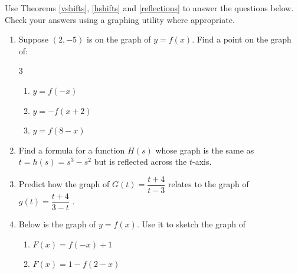 \documentclass{ximera}
\begin{document}
\begin{example}  \label{reflectionsex}  

Use Theorems  \ref{vshifts},  \ref{hshifts} and \ref{reflections}  to answer the questions below.  Check your answers using a graphing utility where appropriate.
 
 \begin{enumerate}
 
 \item   Suppose $(2,-5)$ is on the graph of $y = f(x)$.  Find a point on the graph of:
 
 \begin{multicols}{3}
 
 \begin{enumerate}
 
 \item $y = f(-x)$
 
 \item $y = -f(x+2)$
 
 \item  \label{twotransxrefex} $y = f(8-x)$
 
 \end{enumerate}
 
 \end{multicols}
 
 \item  Find a formula for a function $H(s)$ whose graph is the same as $t=h(s) = s^3-s^2$ but is reflected across the $t$-axis.
 
 \item Predict how the graph of $G(t) = \dfrac{t+4}{t-3}$ relates to the graph of $g(t) =\dfrac{t+4}{3-t}$ . 
 
\item  Below is the graph of $y = f(x)$.  Use it to sketch the graph of
 \begin{enumerate}
 
 \item $F(x) = f(-x)+1$
 
  \item \label{twotransyrefex}  $F(x)= 1 - f(2-x)$
 
 \end{enumerate}
 
 \begin{image}
\end{image}
\end{enumerate}
\end{example}
\end{document}

